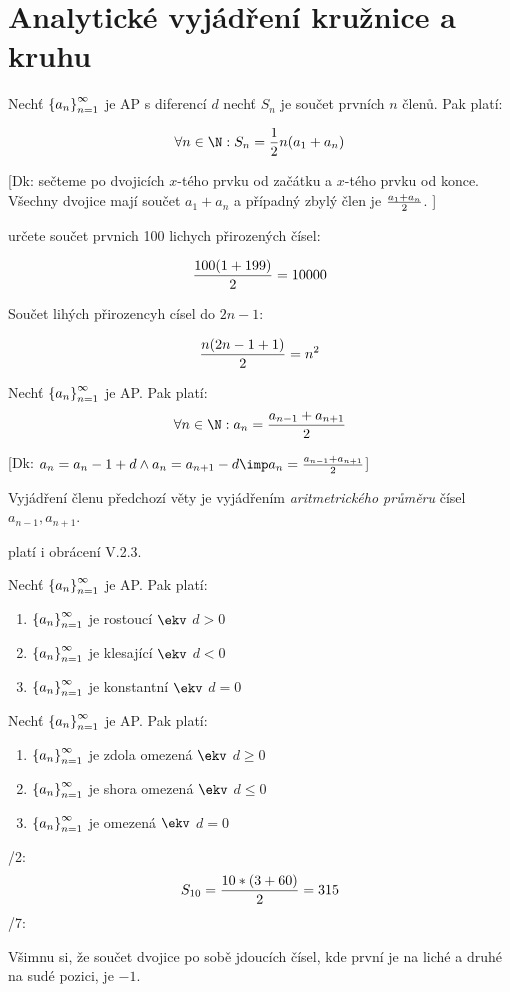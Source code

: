 
\BeginDoc{}
\section{Analytické vyjádření kružnice a kruhu}
\V {\huge\dots}
\V Nechť $\left\{{a_n}\right\}_{n=1}^\infty$ je AP s diferencí $d$ nechť $S_n$ je součet prvních $n$ členů. Pak platí:

$$\forall n\in\N: S_n = \f 12 n (a_1+a_n)$$

[Dk: sečteme po dvojicích $x$-tého prvku od začátku a $x$-tého prvku od konce. Všechny dvojice mají součet $a_1+a_n$ a případný zbylý člen je $\frac{a_1+a_n}2$. ]

\Pr určete součet prvnich 100 lichych přirozených čísel:

$$\f{100\*(1+199)}2 = 10000$$

Součet lihých přirozencyh císel do $2n-1$:

$$\frac {n(2n-1+1)}2 = n^2$$

\V Nechť $\left\{{a_n}\right\}_{n=1}^\infty$ je AP. Pak platí:
$$\forall n\in\N: a_n = \f{a_{n-1}+a_{n+1}}2$$

[Dk: $a_n = a_n-1+d \land a_n=a_{n+1}-d \imp a_n = \f{a_{n-1}+a_{n+1}}2$]

\Pozenum Vyjádření členu předchozí věty je vyjádřením \emph{aritmetrického průměru} čísel $a_{n-1},a_{n+1}$.
\item platí i obrácení V.2.3.

\V Nechť $\left\{{a_n}\right\}_{n=1}^\infty$ je AP. Pak platí:
\begin{enumerate}
\item $\left\{{a_n}\right\}_{n=1}^\infty$ je rostoucí $\ekv$ $d>0$
\item $\left\{{a_n}\right\}_{n=1}^\infty$ je klesající $\ekv$ $d<0$
\item $\left\{{a_n}\right\}_{n=1}^\infty$ je konstantní $\ekv$ $d=0$
\end{enumerate}

\V Nechť $\left\{{a_n}\right\}_{n=1}^\infty$ je AP. Pak platí:
\begin{enumerate}
\item $\left\{{a_n}\right\}_{n=1}^\infty$ je zdola omezená $\ekv$ $d\ge 0$
\item $\left\{{a_n}\right\}_{n=1}^\infty$ je shora omezená $\ekv$ $d\le 0$
\item $\left\{{a_n}\right\}_{n=1}^\infty$ je omezená $\ekv$ $d=0$
\end{enumerate}

/2:
$$S_{10} = \frac{10*(3+60)}2 = 315$$
/7:

Všimnu si, že součet dvojice po sobě jdoucích čísel, kde první je na liché a druhé na sudé pozici, je $-1$.

